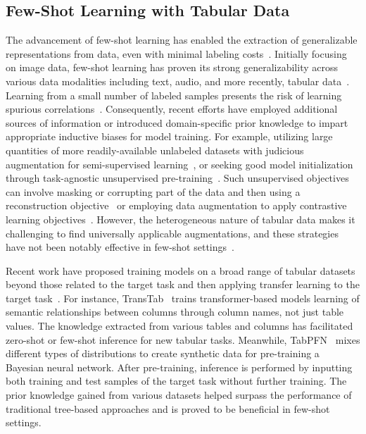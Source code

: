 \subsection{Few-Shot Learning with Tabular Data} The advancement of few-shot learning has enabled the extraction of generalizable representations from data, even with minimal labeling costs~\cite{chen2018closer}. Initially focusing on image data, few-shot learning has proven its strong generalizability across various data modalities including text, audio, and more recently, tabular data~\cite{majumder2022few,nam2023stunt,schick2021exploiting}. Learning from a small number of labeled samples presents the risk of learning spurious correlations~\cite{bartlett2021deep}. Consequently, recent efforts have employed additional sources of information or introduced domain-specific prior knowledge to impart appropriate inductive biases for model training. For example, utilizing large quantities of more readily-available unlabeled datasets with judicious augmentation for semi-supervised learning~\cite{ucar2021subtab,yoon2020vime}, or seeking good model initialization through task-agnostic unsupervised pre-training~\cite{somepalli2021saint}. Such unsupervised objectives can involve masking or corrupting part of the data and then using a reconstruction objective~\cite{arik2021tabnet,majmundar2022met} or employing data augmentation to apply contrastive learning objectives~\cite{bahri2022scarf,chen2020simple}. However, the heterogeneous nature of tabular data makes it challenging to find universally applicable augmentations, and these strategies have not been notably effective in few-shot settings~\cite{nam2023stunt}. 

Recent work have proposed training models on a broad range of tabular datasets beyond those related to the target task and then applying transfer learning to the target task~\cite{zhang2023generative,levin2022transfer,zhu2023xtab}. For instance, TransTab~\cite{wang2022transtab} trains transformer-based models learning of semantic relationships between columns through column names, not just table values. The knowledge extracted from various tables and columns has facilitated zero-shot or few-shot inference for new tabular tasks. Meanwhile, TabPFN~\cite{hollmann2022tabpfn} mixes different types of distributions to create synthetic data for pre-training a Bayesian neural network. After pre-training, inference is performed by inputting both training and test samples of the target task without further training. The prior knowledge gained from various datasets helped surpass the performance of traditional tree-based approaches and is proved to be beneficial in few-shot settings.

